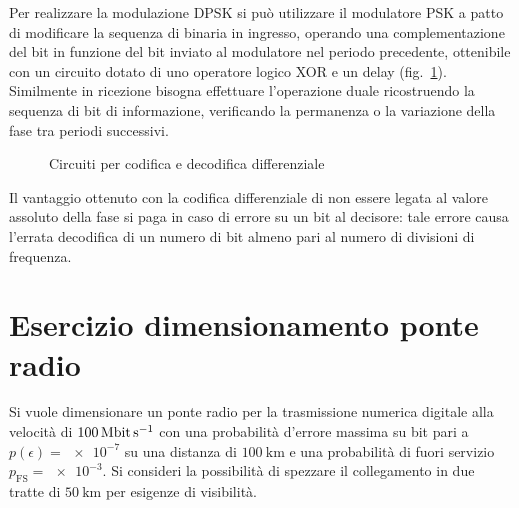 Per realizzare la modulazione \ac{DPSK} si può utilizzare il modulatore \ac{PSK} a patto di modificare la sequenza di binaria in ingresso, operando una complementazione del bit in funzione del bit inviato al modulatore nel periodo precedente, ottenibile con un circuito dotato di uno operatore logico XOR e un delay (fig.~\ref{fig:DPSK_circuiti}). Similmente in ricezione bisogna effettuare l'operazione duale ricostruendo la sequenza di bit di informazione, verificando la permanenza o la variazione della fase tra periodi successivi.
\begin{figure}[!ht]
	\centering
		\quad{}
			\caption{Circuiti per codifica e decodifica differenziale}
			\label{fig:DPSK_circuiti}
\end{figure}
Il vantaggio ottenuto con la codifica differenziale di non essere legata al valore assoluto della fase si paga in caso di errore su un bit al decisore: tale errore causa l'errata decodifica di un numero di bit almeno pari al numero di divisioni di frequenza.

\clearpage
\section{Esercizio dimensionamento ponte radio}
\begin{esercizio}
Si vuole dimensionare un ponte radio per la trasmissione numerica digitale alla velocità di $\SI{100}{\mega\bit\per\second}$ con una probabilità d'errore massima su bit pari a $p(\epsilon)=\num{e-7}$ su una distanza di $\SI{100}{\kilo\meter}$ e una probabilità di fuori servizio $p_\text{FS}=\num{e-3}$. Si consideri la possibilità di spezzare il collegamento in due tratte di $\SI{50}{\kilo\meter}$ per esigenze di visibilità.
\end{esercizio}

